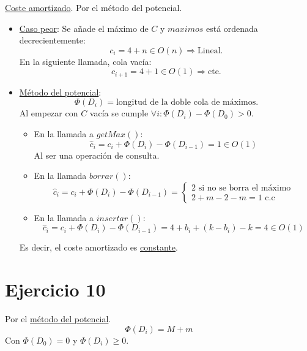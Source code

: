 \documentclass[10pt,a4paper,openright]{book}
\theoremstyle{break}
\begin{document}
\underline{Coste amortizado}. Por el método del potencial.
\begin{itemize}
    \item \underline{Caso peor}: Se añade el máximo de $C$ y $maximos$ está ordenada decrecientemente:
    \[
    c_i = 4 + n \in O\left( n \right) \Rightarrow \text{Lineal.} 
    \]
    En la siguiente llamada, cola vacía: 
    \[
    c_{i+1} = 4 + 1 \in O\left( 1 \right) \Rightarrow \text{cte.} 
    \]
    \item \underline{Método del potencial}: 
    \[
    \Phi\left( D_i \right) = \text{longitud de la doble cola de máximos.} 
    \]
    Al empezar con $C$ vacía se cumple $\forall i: \Phi\left( D_i \right) - \Phi\left( D_{0} \right) > 0$.
    \begin{itemize}
        \item En la llamada a $getMax\left( \right)$: 
        \[
        \hat{c}_i = c_i + \Phi\left( D_i \right) - \Phi\left( D_{i-1} \right) = 1 \in O\left( 1 \right)
        \] Al ser una operación de consulta.
        \item En la llamada $borrar\left(  \right)$: 
        \[
        \hat{c}_i = c_i + \Phi\left( D_i \right) - \Phi\left( D_{i-1} \right) = \begin{cases}
            2 \text{ si no se borra el máximo}\\
            2 + m - 2 -m = 1 \text{ c.c} 
        \end{cases} 
        \]
        \item En la llamada a $insertar\left( \right)$:
        \[
        \hat{c}_i = c_i + \Phi\left( D_i \right) - \Phi\left( D_{i-1} \right) = 4 + b_i + \left( k - b_i \right) - k = 4 \in O\left( 1 \right)
        \]
    \end{itemize}
    Es decir, el coste amortizado es \underline{constante}.
\end{itemize}

\section{Ejercicio 10}%
\label{sec:ejercicio_10}
Por el \underline{método del potencial}. 
\[
\Phi\left( D_i \right) = M + m
\]
Con $\Phi\left( D_0 \right) = 0$ y $\Phi\left( D_i \right) \ge 0$.
\end{document}
